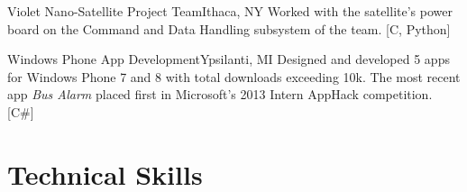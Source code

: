 \documentclass[11pt,letterpaper,sans]{moderncv}
\begin{document}
{Violet Nano-Satellite Project Team}{Ithaca, NY}
{}
{Worked with the satellite's power board on the Command and Data Handling subsystem of the team. [C, Python]}
\medskip

{Windows Phone App Development}{Ypsilanti, MI}
{}
{Designed and developed 5 apps for Windows Phone 7 and 8 with total downloads exceeding 10k.  The most recent app \emph{Bus Alarm} placed first in Microsoft's 2013 Intern AppHack competition. [C\#]}
\medskip



\section{Technical Skills}
\medskip
{}
\end{document}
